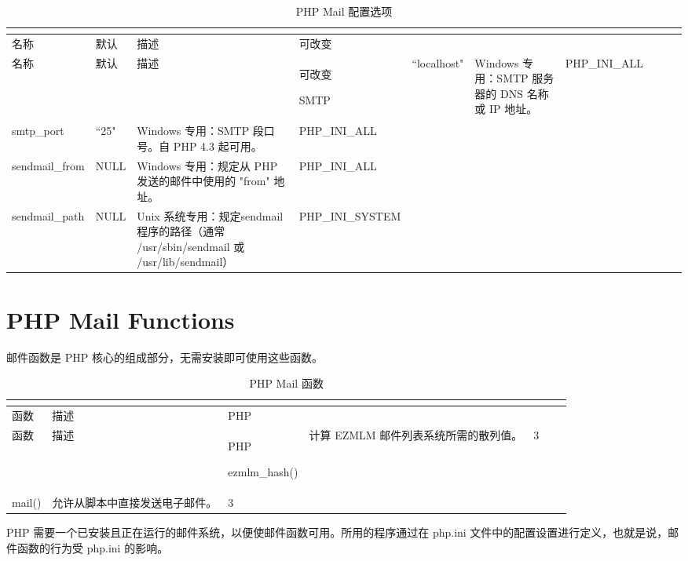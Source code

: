 \begin{longtable}{|m{60pt}|m{45pt}|m{190pt}|m{80pt}|}
\tabularnewline\hline
名称	&默认	&描述	&可改变
\endhead

\caption{PHP Mail 配置选项}\\
\hline
名称	&默认	&描述	&可改变
\endfirsthead

\endfoot

\endlastfoot

\hline
SMTP			&``localhost"	&Windows 专用：SMTP 服务器的 DNS 名称或 IP 地址。	&PHP\_INI\_ALL\\
\hline
smtp\_port		&``25"			&Windows 专用：SMTP 段口号。自 PHP 4.3 起可用。&PHP\_INI\_ALL\\
\hline
sendmail\_from	&NULL			&Windows 专用：规定从 PHP 发送的邮件中使用的 "from" 地址。&PHP\_INI\_ALL\\
\hline
sendmail\_path	&	NULL		&Unix 系统专用：规定sendmail 程序的路径（通常 /usr/sbin/sendmail 或 /usr/lib/sendmail）	&PHP\_INI\_SYSTEM\\
\hline
\end{longtable}


\section{PHP Mail Functions}

邮件函数是 PHP 核心的组成部分，无需安装即可使用这些函数。

\begin{longtable}{|m{120pt}|m{250pt}|m{20pt}|}
\tabularnewline\hline
函数	&描述	&PHP
\endhead

\caption{PHP Mail 函数}\\
\hline
函数	&描述	&PHP
\endfirsthead

\endfoot

\endlastfoot

\hline
ezmlm\_hash()	&计算 EZMLM 邮件列表系统所需的散列值。	&3\\
\hline
mail()			&允许从脚本中直接发送电子邮件。	&3\\
\hline
\end{longtable}

PHP 需要一个已安装且正在运行的邮件系统，以便使邮件函数可用。所用的程序通过在 php.ini 文件中的配置设置进行定义，也就是说，邮件函数的行为受 php.ini 的影响。





